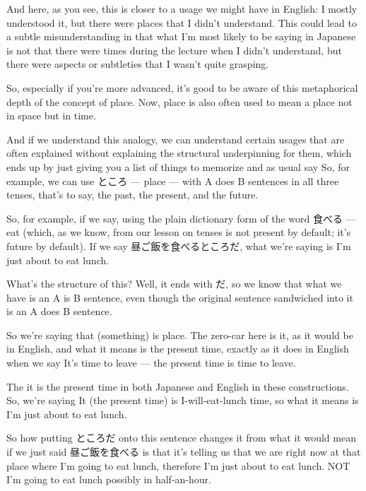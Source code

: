 And here, as you see, this is closer to a usage we might have in English: I mostly understood it, but there were places that I didn't understand. This could lead to a subtle misunderstanding in that what I'm most likely to be saying in Japanese is not that there were times during the lecture when I didn't understand, but there were aspects or subtleties that I wasn't quite grasping.

So, especially if you're more advanced, it's good to be aware of this metaphorical depth of the concept of place. Now, place is also often used to mean a place not in space but in time.

And if we understand this analogy, we can understand certain usages that are often explained without explaining the structural underpinning for them, which ends up by just giving you a list of things to memorize and as usual say  So, for example, we can use ところ --- place --- with A does B sentences in all three tenses, that's to say, the past, the present, and the future.

So, for example, if we say, using the plain dictionary form of the word 食べる --- eat (which, as we know, from our lesson on tenses is not present by default; it's future by default). If we say 昼ご飯を食べるところだ, what we're saying is I'm just about to eat lunch.

What's the structure of this? Well, it ends with だ, so we know that what we have is an A is B sentence, even though the original sentence sandwiched into it is an A does B sentence.

{}

So we're saying that (something) is place. The zero-car here is it, as it would be in English, and what it means is the present time, exactly as it does in English when we say It's time to leave --- the present time is time to leave.

The it is the present time in both Japanese and English in these constructions. So, we're saying It (the present time) is I-will-eat-lunch time, so what it means is I'm just about to eat lunch.

So how putting ところだ onto this sentence changes it from what it would mean if we just said 昼ご飯を食べる is that it's telling us that we are right now at that place where I'm going to eat lunch, therefore I'm just about to eat lunch. NOT I'm going to eat lunch possibly in half-an-hour.

